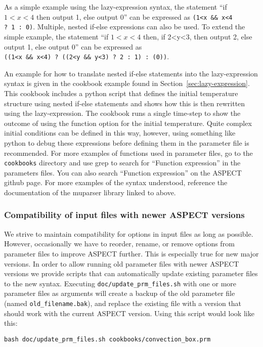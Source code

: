 \documentclass{article}
\newcommand{\aspect}{\textsc{ASPECT}}
\begin{document}
As a simple example using the lazy-expression syntax, the statement ``if $1<x<4$ then output 1, else output 0''
can be expressed as \texttt{(1<x\ \&\&\ x<4 ?\ 1\ :\ 0)}.  Multiple, nested if-else expressions
can also be used. To extend the simple example, the statement  
``if $1<x<4$ then, if 2<y<3, then output 2, else output 1, else output 0''
can be expressed as \texttt{((1<x\ \&\&\ x<4)\ ?\ ((2<y\ \&\&\ y<3)\ ?\ 2\ :\ 1)\ :\ (0))}.

An example for how to translate nested if-else statements into the lazy-expression syntax is given in the
cookbook example found in Section~\ref{sec:lazy-expression}. This cookbook includes a python script that defines
the initial temperature structure using nested if-else statements and shows how this is then rewritten
using the lazy-expression. The cookbook runs a single time-step to show the outcome of using the function
option for the initial temperature. Quite complex initial conditions can be defined in this way, however,
using something like python to debug these expressions before defining them in the parameter file is 
recommended. For more examples of functions used in parameter files, go to the \texttt{cookbooks} 
directory and use grep to search for ``Function expression'' in the parameters files. 
You can also search ``Function expression'' on the \aspect{} github page.
For more examples of the syntax understood, reference the documentation of the muparser library
linked to above.

\subsubsection{Compatibility of input files with newer \aspect{} versions}

We strive to maintain compatibility for options in input files as long as
possible. However, occasionally we have to reorder, rename, or remove options
from parameter files to improve \aspect{} further. This is especially true
for new major versions. In order to allow running old parameter files with
newer \aspect{} versions we provide scripts that can automatically update
existing parameter files to the new syntax. Executing
\texttt{doc/update\_prm\_files.sh} with one or more parameter files as
arguments will create a backup of the old parameter file (named
\texttt{old\_filename.bak}), and replace the existing file with a version that
should work with the current \aspect{} version. Using this script would look
like this:

\begin{lstlisting}[frame=single,language=ksh,showstringspaces=false]
bash doc/update_prm_files.sh cookbooks/convection_box.prm
\end{lstlisting}
\end{document}
